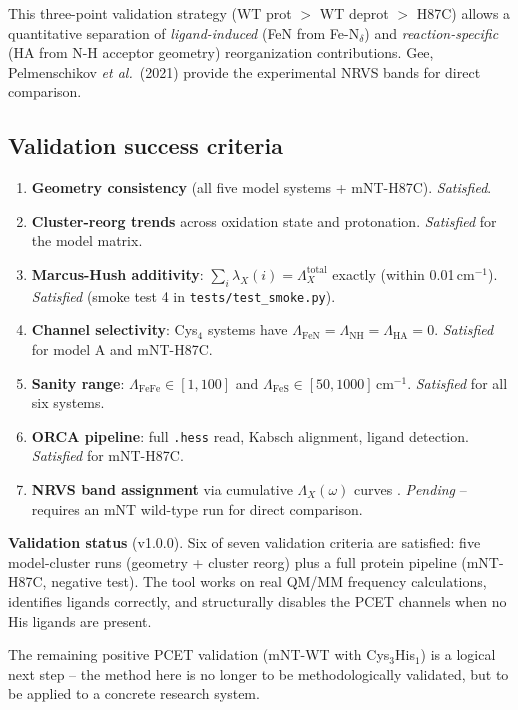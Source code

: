 \documentclass[11pt,a4paper,twoside]{article}
\theoremstyle{remark}
\begin{document}
This three-point validation strategy (WT prot $>$ WT deprot $>$
H87C) allows a quantitative separation of
\emph{ligand-induced} (FeN from Fe-N$_\delta$) and
\emph{reaction-specific} (HA from N-H acceptor geometry)
reorganization contributions. Gee, Pelmenschikov \emph{et al.}\
(2021) \cite{Gee2021} provide the experimental NRVS bands for
direct comparison.

\subsection{Validation success criteria}
\label{sec:val-erfolgskriterien}

\begin{enumerate}
  \item \textbf{Geometry consistency} (all five model systems +
        mNT-H87C). \emph{Satisfied}.
  \item \textbf{Cluster-reorg trends} across oxidation state and
        protonation. \emph{Satisfied} for the model matrix.
  \item \textbf{Marcus-Hush additivity}: $\sum_i \lambda_X(i) =
        \Lambda_X^\text{total}$ exactly (within
        0.01\,cm$^{-1}$). \emph{Satisfied} (smoke test 4 in
        \texttt{tests/test\_smoke.py}).
  \item \textbf{Channel selectivity}: Cys$_4$ systems have
        $\Lambda_\text{FeN} = \Lambda_\text{NH} =
        \Lambda_\text{HA} = 0$. \emph{Satisfied} for model A and
        mNT-H87C.
  \item \textbf{Sanity range}: $\Lambda_\text{FeFe} \in [1, 100]$
        and $\Lambda_\text{FeS} \in [50, 1000]$\,cm$^{-1}$.
        \emph{Satisfied} for all six systems.
  \item \textbf{ORCA pipeline}: full \texttt{.hess} read, Kabsch
        alignment, ligand detection. \emph{Satisfied} for
        mNT-H87C.
  \item \textbf{NRVS band assignment} via cumulative
        $\Lambda_X(\omega)$ curves \cite{Gee2021,Wang2025}.
        \emph{Pending} -- requires an mNT wild-type run for
        direct comparison.
\end{enumerate}

\begin{infobox}
\textbf{Validation status} (v1.0.0).
Six of seven validation criteria are satisfied: five model-cluster
runs (geometry + cluster reorg) plus a full protein pipeline
(mNT-H87C, negative test). The tool works on real QM/MM frequency
calculations, identifies ligands correctly, and structurally
disables the PCET channels when no His ligands are present.

The remaining positive PCET validation (mNT-WT with
Cys$_3$His$_1$) is a logical next step -- the method here is no
longer to be methodologically validated, but to be applied to a
concrete research system.
\end{infobox}
\end{document}
